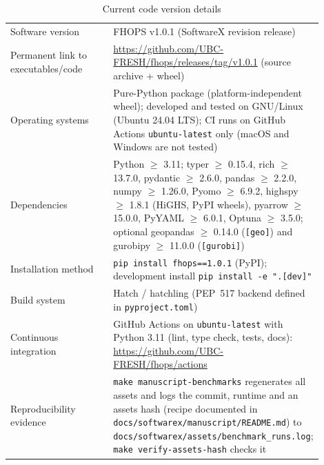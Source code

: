\begin{table}[ht]
  \centering
  \caption{Current code version details}
  \label{tab:current-code-version}
  \begin{tabular}{p{0.35\linewidth}p{0.55\linewidth}}
    \hline
    Software version & FHOPS v1.0.1 (SoftwareX revision release) \\
    Permanent link to executables/code & \url{https://github.com/UBC-FRESH/fhops/releases/tag/v1.0.1} (source archive + wheel) \\
    Operating systems & Pure-Python package (platform-independent wheel); developed and tested on GNU/Linux (Ubuntu 24.04 LTS); CI runs on GitHub Actions \texttt{ubuntu-latest} only (macOS and Windows are not tested) \\
    Dependencies & Python $\geq$ 3.11; typer $\geq$ 0.15.4, rich $\geq$ 13.7.0, pydantic $\geq$ 2.6.0, pandas $\geq$ 2.2.0, numpy $\geq$ 1.26.0, Pyomo $\geq$ 6.9.2, highspy $\geq$ 1.8.1 (HiGHS, PyPI wheels), pyarrow $\geq$ 15.0.0, PyYAML $\geq$ 6.0.1, Optuna $\geq$ 3.5.0; optional geopandas $\geq$ 0.14.0 (\texttt{[geo]}) and gurobipy $\geq$ 11.0.0 (\texttt{[gurobi]}) \\
    Installation method & \texttt{pip install fhops==1.0.1} (PyPI); development install \texttt{pip install -e ".[dev]"} \\
    Build system & Hatch / hatchling (PEP~517 backend defined in \texttt{pyproject.toml}) \\
    Continuous integration & GitHub Actions on \texttt{ubuntu-latest} with Python 3.11 (lint, type check, tests, docs): \url{https://github.com/UBC-FRESH/fhops/actions} \\
    Reproducibility evidence & \texttt{make manuscript-benchmarks} regenerates all assets and logs the commit, runtime and an assets hash (recipe documented in \texttt{docs/softwarex/manuscript/README.md}) to \texttt{docs/softwarex/assets/benchmark\_runs.log}; \texttt{make verify-assets-hash} checks it \\
    \hline
  \end{tabular}
\end{table}
